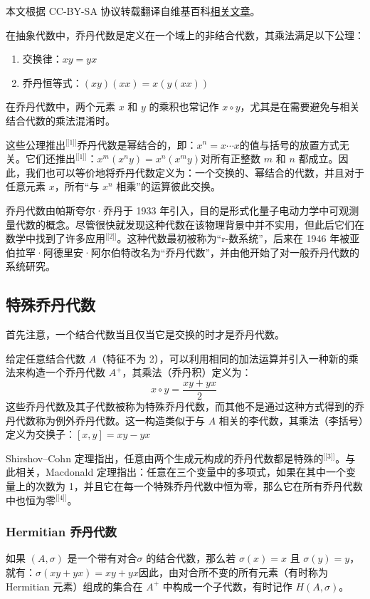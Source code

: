 
本文根据 CC-BY-SA 协议转载翻译自维基百科\href{https://en.wikipedia.org/wiki/Jordan_algebra}{相关文章}。

在抽象代数中，乔丹代数是定义在一个域上的非结合代数，其乘法满足以下公理：
\begin{enumerate}
\item 交换律：$xy = yx$
\item 乔丹恒等式：$(xy)(xx) = x(y(xx))$
\end{enumerate}
在乔丹代数中，两个元素 $x$ 和 $y$ 的乘积也常记作 $x \circ y$，尤其是在需要避免与相关结合代数的乘法混淆时。

这些公理推出\(^\text{[[1]]}\)乔丹代数是幂结合的，即：$x^n = x \cdots x$的值与括号的放置方式无关。它们还推出\(^\text{[[1]]}\)：$x^{m}(x^{n}y) = x^{n}(x^{m}y)$对所有正整数 $m$ 和 $n$ 都成立。因此，我们也可以等价地将乔丹代数定义为：一个交换的、幂结合的代数，并且对于任意元素 $x$，所有“与 $x^n$ 相乘”的运算彼此交换。

乔丹代数由帕斯夸尔·乔丹于 1933 年引入，目的是形式化量子电动力学中可观测量代数的概念。尽管很快就发现这种代数在该物理背景中并不实用，但此后它们在数学中找到了许多应用\(^\text{[[2]]}\)。这种代数最初被称为“r-数系统”，后来在 1946 年被亚伯拉罕·阿德里安·阿尔伯特改名为“乔丹代数”，并由他开始了对一般乔丹代数的系统研究。
\subsection{特殊乔丹代数}
首先注意，一个结合代数当且仅当它是交换的时才是乔丹代数。

给定任意结合代数 $A$（特征不为 2），可以利用相同的加法运算并引入一种新的乘法来构造一个乔丹代数 $A^+$，其乘法（乔丹积）定义为：
$$
x \circ y = \frac{xy + yx}{2}~
$$
这些乔丹代数及其子代数被称为特殊乔丹代数，而其他不是通过这种方式得到的乔丹代数称为例外乔丹代数。这一构造类似于与 $A$ 相关的李代数，其乘法（李括号）定义为交换子：$[x, y] = xy - yx$

Shirshov–Cohn 定理指出，任意由两个生成元构成的乔丹代数都是特殊的\(^\text{[[3]]}\)。与此相关，Macdonald 定理指出：任意在三个变量中的多项式，如果在其中一个变量上的次数为 1，并且它在每一个特殊乔丹代数中恒为零，那么它在所有乔丹代数中也恒为零\(^\text{[[4]]}\)。
\subsubsection{Hermitian 乔丹代数}
如果 $(A, \sigma)$ 是一个带有对合$\sigma$ 的结合代数，那么若 $\sigma(x) = x$ 且 $\sigma(y) = y$，就有：$\sigma(xy + yx) = xy + yx$因此，由对合所不变的所有元素（有时称为Hermitian 元素）组成的集合在 $A^+$ 中构成一个子代数，有时记作 $H(A, \sigma)$。
